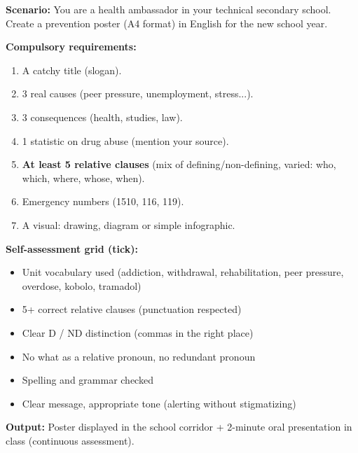 \documentclass[11pt]{article}
\begin{document}
\begin{exercice}
\textbf{Scenario:} You are a health ambassador in your technical secondary school. Create a prevention poster (A4 format) in English for the new school year.

\textbf{Compulsory requirements:}
\begin{enumerate}
\item A catchy title (slogan).
\item 3 real causes (peer pressure, unemployment, stress...).
\item 3 consequences (health, studies, law).
\item 1 statistic on drug abuse (mention your source).
\item \textbf{At least 5 relative clauses} (mix of defining/non-defining, varied: who, which, where, whose, when).
\item Emergency numbers (1510, 116, 119).
\item A visual: drawing, diagram or simple infographic.
\end{enumerate}

\textbf{Self-assessment grid (tick):}
\begin{itemize}
\item[$\square$] Unit vocabulary used (addiction, withdrawal, rehabilitation, peer pressure, overdose, kobolo, tramadol)
\item[$\square$] 5+ correct relative clauses (punctuation respected)
\item[$\square$] Clear D / ND distinction (commas in the right place)
\item[$\square$] No \og what\fg{} as a relative pronoun, no redundant pronoun
\item[$\square$] Spelling and grammar checked
\item[$\square$] Clear message, appropriate tone (alerting without stigmatizing)
\end{itemize}

\textbf{Output:} Poster displayed in the school corridor + 2-minute oral presentation in class (continuous assessment).
\end{exercice}
\end{document}
